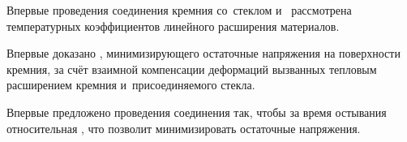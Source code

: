 \item \label{novelty_one}%
Впервые 
проведения соединения кремния со~стеклом и~
рассмотрена
температурных коэффициентов линейного расширения
материалов.

\item \label{novelty_two}%
Впервые доказано , минимизирующего остаточные напряжения на поверхности
кремния, за счёт взаимной компенсации деформаций вызванных
тепловым расширением кремния и~присоединяемого стекла.
%
\vyvodivmain

\item \label{novelty_three}Впервые предложено
 проведения соединения так, чтобы
 за время остывания относительная ,
что позволит минимизировать остаточные напряжения.
